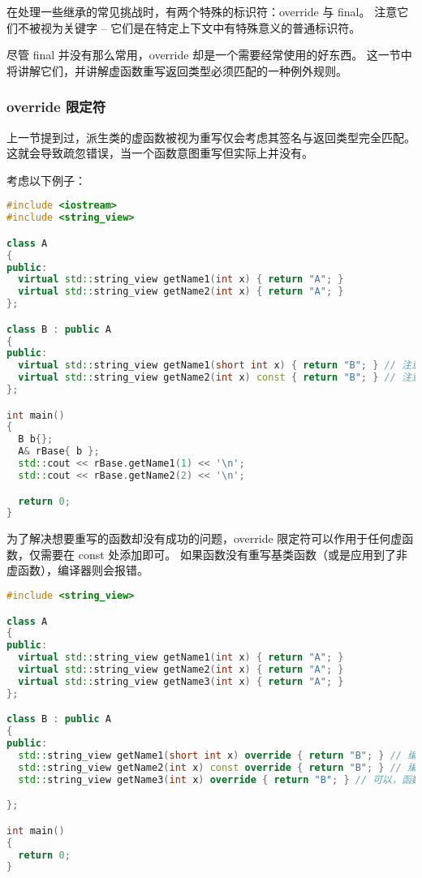 \documentclass[../../LearnCpp.tex]{subfiles}
\begin{document}

在处理一些继承的常见挑战时，有两个特殊的标识符：override 与 final。
注意它们不被视为关键字 -- 它们是在特定上下文中有特殊意义的普通标识符。

尽管 final 并没有那么常用，override 却是一个需要经常使用的好东西。
这一节中将讲解它们，并讲解虚函数重写返回类型必须匹配的一种例外规则。

\subsubsection*{override 限定符}

上一节提到过，派生类的虚函数被视为重写仅会考虑其签名与返回类型完全匹配。
这就会导致疏忽错误，当一个函数意图重写但实际上并没有。

考虑以下例子：

\begin{lstlisting}[language=C++]
#include <iostream>
#include <string_view>

class A
{
public:
  virtual std::string_view getName1(int x) { return "A"; }
  virtual std::string_view getName2(int x) { return "A"; }
};

class B : public A
{
public:
  virtual std::string_view getName1(short int x) { return "B"; } // 注意：参数是 short int
  virtual std::string_view getName2(int x) const { return "B"; } // 注意：函数是 const
};

int main()
{
  B b{};
  A& rBase{ b };
  std::cout << rBase.getName1(1) << '\n';
  std::cout << rBase.getName2(2) << '\n';

  return 0;
}
\end{lstlisting}

为了解决想要重写的函数却没有成功的问题，override 限定符可以作用于任何虚函数，仅需要在 const 处添加即可。
如果函数没有重写基类函数（或是应用到了非虚函数），编译器则会报错。

\begin{lstlisting}[language=C++]
#include <string_view>

class A
{
public:
  virtual std::string_view getName1(int x) { return "A"; }
  virtual std::string_view getName2(int x) { return "A"; }
  virtual std::string_view getName3(int x) { return "A"; }
};

class B : public A
{
public:
  std::string_view getName1(short int x) override { return "B"; } // 编译错误，函数并没有重写
  std::string_view getName2(int x) const override { return "B"; } // 编译错误，函数并没有重写
  std::string_view getName3(int x) override { return "B"; } // 可以，函数重写了 A::getName3(int)

};

int main()
{
  return 0;
}
\end{lstlisting}
\end{document}

